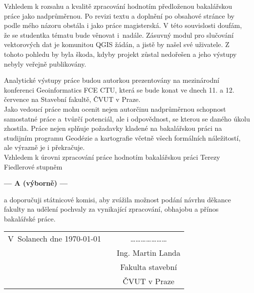 \documentclass[czech,11pt,a4paper]{article}
\begin{document}
Vzhledem k rozsahu a kvalitě zpracování hodnotím předloženou
bakalářskou práce jako nadprůměrnou. Po revizi textu a doplnění po
obsahové stránce by podle mého názoru obstála i jako práce
magisterská. V této souvislosti doufám, že se studentka tématu bude
věnovat i~nadále. Zásuvný modul pro slučování vektorových dat je
komunitou QGIS žádán, a jistě by našel své uživatele. Z tohoto pohledu
by byla škoda, kdyby projekt zůstal nedořešen a jeho výstupy nebyly
veřejně publikovány.

Analytické výstupy práce budou autorkou prezentovány na mezinárodní
konferenci Geoinformatics FCE CTU, která se bude konat ve dnech 11. a
12. července na Stavební fakultě, ČVUT v Praze.
\\

Jako vedoucí práce mohu ocenit nejen autorčinu nadprůměrnou schopnost
samostatné práce a~tvůrčí potenciál, ale i odpovědnost, se kterou se
daného úkolu zhostila. Práce nejen splňuje požadavky kladené na
bakalářskou práci na studijním programu Geodézie a kartografie včetně
všech formálních náležitostí, ale výrazně je i překračuje. \\

Vzhledem k úrovni zpracování práce hodnotím bakalářskou práci Terezy
Fiedlerové stupněm

\begin{center}
{\bf --- A (výborně)  ---}
\end{center}

a doporučuji státnicové komisi, aby zvážila možnost podání návrhu
děkance fakulty na udělení pochvaly za vynikající zpracování, obhajobu
a přínos bakalářské práce.

\vspace{2cm}

\begin{tabular}{lp{}c}
V~Solanech dne \today & & \ldots\ldots\ldots\ldots\ldots\ldots\ldots \\
& & Ing. Martin Landa \\
& & Fakulta stavební \\
& & ČVUT v Praze \\
\end{tabular}
\end{document}

